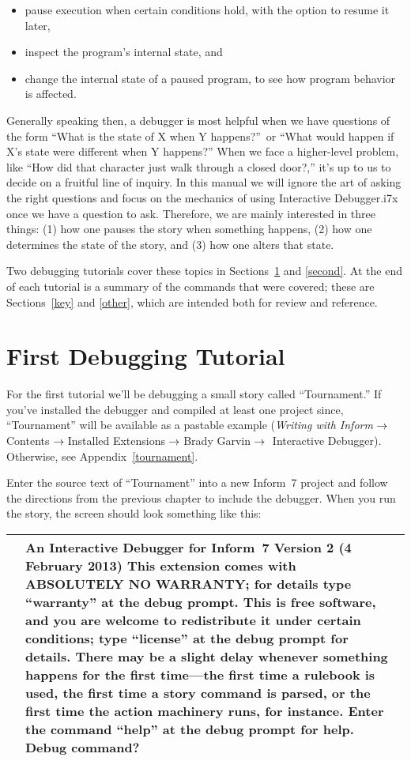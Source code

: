 \documentclass{book}
\newcommand{\lastpagebreak}{\vfill\pagebreak}
\newcommand{\nil}{{\null}}
\newcommand{\thento}{\(\nil\rightarrow\nil\)}
\newcommand{\n}{\hspace*{\fill}\newline}
\newcommand{\terp}[2]{\begin{center}\begin{tabular}{p{0.45\textwidth}|p{0.45\textwidth}}\midrule #1&#2\\\midrule\end{tabular}\end{center}}
\newcommand{\glkheading}[1]{\textbf{#1}}
\newcommand{\cursor}{\raisebox{-1.5pt}{\RectangleThin}}
\begin{document}
\begin{itemize}
  \item{pause execution when certain conditions hold, with the option to resume
    it later,}
  \item{inspect the program's internal state, and}
  \item{change the internal state of a paused program, to see how program
    behavior is affected.}
\end{itemize}

\noindent Generally speaking then, a debugger is most helpful when we have
questions of the form ``What is the state of X when Y happens?''\ or ``What
would happen if X's state were different when Y happens?''  When we face a
higher-level problem, like ``How did that character just walk through a closed
door?,'' it's up to us to decide on a fruitful line of inquiry.  In this manual
we will ignore the art of asking the right questions and focus on the mechanics
of using Interactive Debugger.i7x once we have a question to ask.  Therefore, we
are mainly interested in three things: (1) how one pauses the story when
something happens, (2) how one determines the state of the story, and (3) how
one alters that state.

Two debugging tutorials cover these topics in Sections~\ref{first} and
\ref{second}.  At the end of each tutorial is a summary of the commands that
were covered; these are Sections~\ref{key} and \ref{other}, which are intended
both for review and reference.

\lastpagebreak

\section{First Debugging Tutorial}
\label{first}

For the first tutorial we'll be debugging a small story called ``Tournament.''
If you've installed the debugger and compiled at least one project since,
``Tournament'' will be available as a pastable example (\emph{Writing with
  Inform}\thento Contents\thento Installed Extensions\thento Brady Garvin\thento
Interactive Debugger).  Otherwise, see Appendix~\ref{tournament}.

Enter the source text of ``Tournament'' into a new Inform~7 project and follow
the directions from the previous chapter to include the debugger.  When you run
the story, the screen should look something like this:

\terp{\null}{%
  \glkheading{An Interactive Debugger for Inform~7}\n
  \glkheading{Version 2 (4 February 2013)}\n
  \n
  This extension comes with ABSOLUTELY NO WARRANTY; for details type ``warranty'' at the debug prompt.\n
  \n
  This is free software, and you are welcome to redistribute it under certain conditions; type ``license'' at the debug prompt for details.\n
  \n
  There may be a slight delay whenever something happens for the first time---the first time a rulebook is used, the first time a story command is parsed, or the first time the action machinery runs, for instance.\n
  \n
  Enter the command ``help'' at the debug prompt for help.\n
  \n
  Debug command?\ \cursor}
\end{document}
